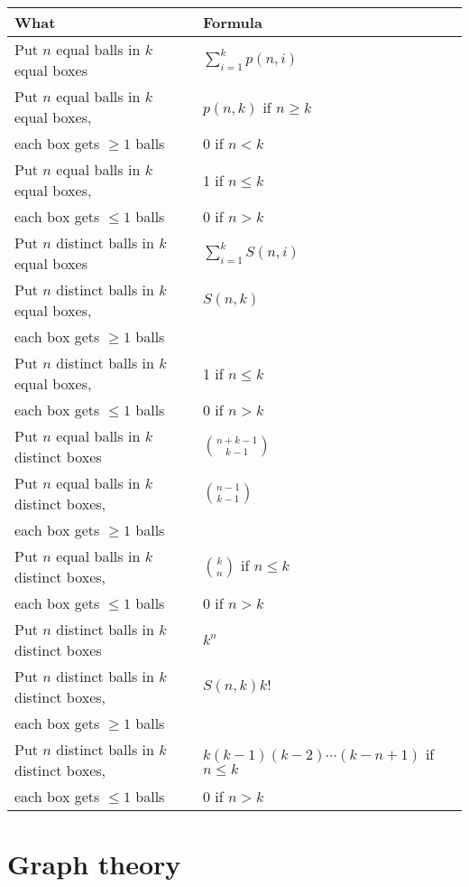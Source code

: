 \documentclass[a4paper,11pt]{article}
\begin{document}
\begin{tabular}{|l|l|}
	\hline
	\hline
		What & Formula \\
	\hline
	\hline
		Put $n$ equal balls in $k$ equal boxes & $\sum_{i=1}^k p(n,i)$ \\
	\hline
		Put $n$ equal balls in $k$ equal boxes,  & $p(n,k)$ if $n\geq k$ \\
		 each box gets $\geq 1$ balls  & 0 if $n<k$ \\
	\hline
		Put $n$ equal balls in $k$ equal boxes,  & 1 if $n\leq k$ \\
		 each box gets $\leq 1$ balls &  0 if $n > k$ \\
	\hline
	\hline
		Put $n$ distinct balls in $k$ equal boxes  & $\sum_{i=1}^k S(n,i)$ \\
	\hline
		Put $n$ distinct balls in $k$ equal boxes,  & $S(n,k)$ \\
		 each box gets $\geq 1$ balls  & \\
	\hline
		Put $n$ distinct balls in $k$ equal boxes,  & 1 if $n \leq k$ \\
		 each box gets $\leq 1$ balls &  0 if $n > k$ \\
	\hline
	\hline
		Put $n$ equal balls in $k$ distinct boxes  & $\binom{n+k-1}{k-1}$ \\
	\hline
		Put $n$ equal balls in $k$ distinct boxes,  & $\binom{n-1}{k-1}$ \\
		 each box gets $\geq 1$ balls  & \\
	\hline
		Put $n$ equal balls in $k$ distinct boxes,  & $\binom{k}{n}$ if $n\leq k$ \\
		 each box gets $\leq 1$ balls  & 0 if $n>k$ \\
	\hline
	\hline
		Put $n$ distinct balls in $k$ distinct boxes  & $k^n$ \\
	\hline
		Put $n$ distinct balls in $k$ distinct boxes,  & $S(n,k)k!$ \\
		 each box gets $\geq 1$ balls  & \\
	\hline
		Put $n$ distinct balls in $k$ distinct boxes,  & $k(k-1)(k-2)\cdots (k-n+1)$ if $n\leq k$ \\
		 each box gets $\leq 1$ balls  & 0 if $n > k$ \\
	\hline
	\hline
\end{tabular}

\section{Graph theory}
\end{document}
